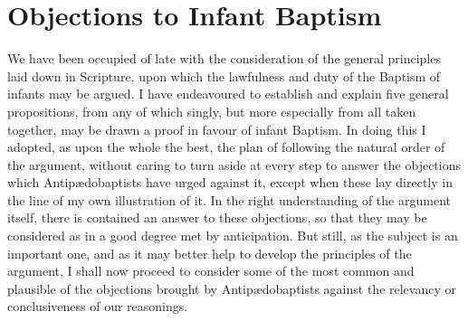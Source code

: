 \documentclass[
]{book}
\begin{document}
\hypertarget{objections-to-infant-baptism}{%
\section{Objections to Infant Baptism}\label{objections-to-infant-baptism}}

We have been occupied of late with the consideration of the general principles laid down in Scripture, upon which the lawfulness and duty of the Baptism of infants may be argued. I have endeavoured to establish and explain five general propositions, from any of which singly, but more especially from all taken together, may be drawn a proof in favour of infant Baptism. In doing this I adopted, as upon the whole the best, the plan of following the natural order of the argument, without caring to turn aside at every step to answer the objections which Antipædobaptists have urged against it, except when these lay directly in the line of my own illustration of it. In the right understanding of the argument itself, there is contained an answer to these objections, so that they may be considered as in a good degree met by anticipation. But still, as the subject is an important one, and as it may better help to develop the principles of the argument, I shall now proceed to consider some of the most common and plausible of the objections brought by Antipædobaptists against the relevancy or conclusiveness of our reasonings.
\end{document}
